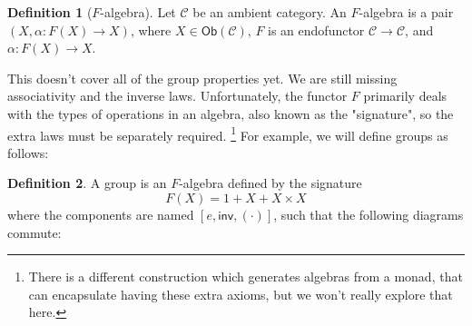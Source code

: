 \documentclass{article}
\theoremstyle{plain}
\theoremstyle{definition}
\newtheorem{definition}{Definition}
\begin{document}
\begin{definition}[\ensuremath{F}-algebra]
 Let \ensuremath{\mathcal{C}} be an ambient category. An \ensuremath{F}-algebra is a pair \ensuremath{\left( X, \alpha : F\left( X \right) \rightarrow X \right)}, where \ensuremath{X \in \mathsf{Ob}\left( \mathcal{C} \right)}, \ensuremath{F} is an endofunctor \ensuremath{\mathcal{C} \rightarrow \mathcal{C}}, and \ensuremath{\alpha : F\left( X \right) \rightarrow X}. 
\end{definition}


This doesn't cover all of the group properties yet. We are still missing associativity and the inverse laws. Unfortunately, the functor \ensuremath{F} primarily deals with the types of operations in an algebra, also known as the "signature", so the extra laws must be separately required. \footnote{ There is a different construction which generates algebras from a monad, that can encapsulate having these extra axioms, but we won't really explore that here.  } For example, we will define groups as follows:

\begin{definition}
A group is an \ensuremath{F}-algebra defined by the signature \[
F\left( X \right) = 1 + X + X \times X
\] where the components are named \ensuremath{\left[ e, \mathsf{inv}, \left( \cdot \right) \right]}, such that the following diagrams commute:


\begin{center}
\end{center}



\begin{center}
\end{center}



\begin{center}
\end{center}
 
\end{definition}
\end{document}
